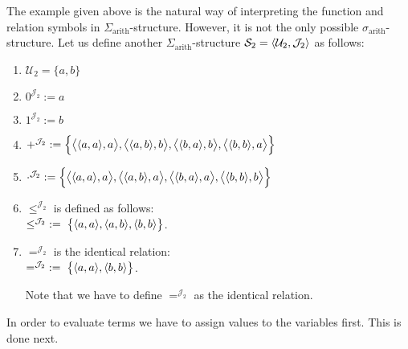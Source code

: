 \example
The example given above is the natural way of interpreting the function and relation symbols in 
$\Sigma_{\mathrm{arith}}$-structure.  However, it is not the only possible
$\sigma_{\mathrm{arith}}$-structure.   Let us define another $\Sigma_{\mathrm{arith}}$-structure
$\mathcal{S}_2 = \langle \mathcal{U}_{2}, \mathcal{J}_{2} \rangle$
as follows:
\begin{enumerate}
\item $\mathcal{U}_{2} = \{ a, b \}$
\item $0^{\mathcal{J}_2} := a$ 
\item $1^{\mathcal{J}_2} := b$ 
\item $+^{\mathcal{J}_2} := \Bigl\{ \bigl\langle\pair(a,a), a\bigr\rangle,
                                   \bigl\langle\pair(a,b), b\bigr\rangle,
                                   \bigl\langle\pair(b,a), b\bigr\rangle,
                                   \bigl\langle\pair(b,b), a\bigr\rangle \Bigr\}$
\item $\cdot^{\mathcal{J}_2} := \Bigl\{ \bigl\langle\pair(a,a), a\bigr\rangle,
                                   \bigl\langle\pair(a,b), a\bigr\rangle,
                                   \bigl\langle\pair(b,a), a\bigr\rangle,
                                   \bigl\langle\pair(b,b), b\bigr\rangle \Bigr\}$
\item $\leq^{\mathcal{J}_2}$ is defined as follows: \\[0.2cm]
       $\leq^{\mathcal{J}_2} \;:=\; \bigl\{ \pair(a,a), \pair(a,b), \pair(b,b) \bigr\}$.
\item $=^{\mathcal{J}_2}$ is the identical relation: \\[0.2cm]
       $=^{\mathcal{J}_2} \;:=\; \bigl\{ \pair(a,a), \pair(b,b) \bigr\}$.

      Note that we have to define $=^{\mathcal{J}_2}$ as the identical relation. 
\end{enumerate}

In order to evaluate terms we have to assign values to the variables first.
This is done next.

